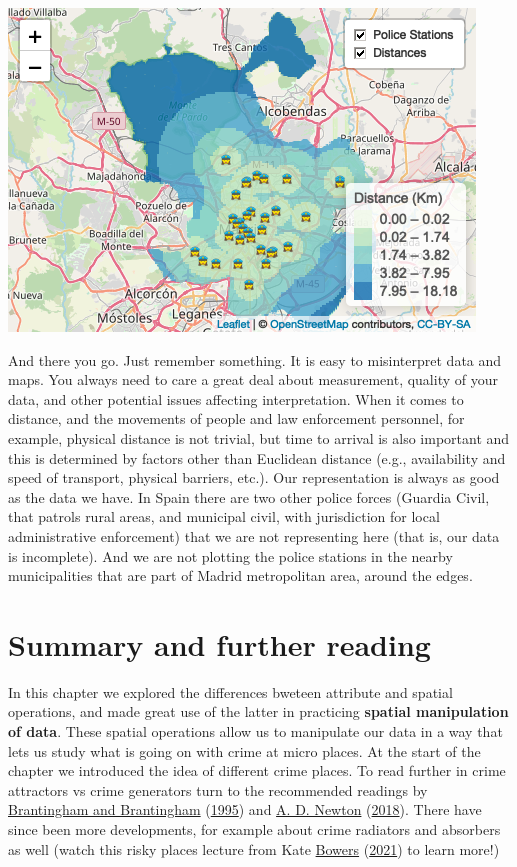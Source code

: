 \documentclass[
  krantz2]{krantz}
\begin{document}
\includegraphics{crime_mapping_files/figure-latex/unnamed-chunk-74-1.png}

And there you go. Just remember something. It is easy to misinterpret data and maps. You always need to care a great deal about measurement, quality of your data, and other potential issues affecting interpretation. When it comes to distance, and the movements of people and law enforcement personnel, for example, physical distance is not trivial, but time to arrival is also important and this is determined by factors other than Euclidean distance (e.g., availability and speed of transport, physical barriers, etc.). Our representation is always as good as the data we have. In Spain there are two other police forces (Guardia Civil, that patrols rural areas, and municipal civil, with jurisdiction for local administrative enforcement) that we are not representing here (that is, our data is incomplete). And we are not plotting the police stations in the nearby municipalities that are part of Madrid metropolitan area, around the edges.

\hypertarget{summary-and-further-reading-1}{%
\section{Summary and further reading}\label{summary-and-further-reading-1}}

In this chapter we explored the differences bweteen attribute and spatial operations, and made great use of the latter in practicing \textbf{spatial manipulation of data}. These spatial operations allow us to manipulate our data in a way that lets us study what is going on with crime at micro places. At the start of the chapter we introduced the idea of different crime places. To read further in crime attractors vs crime generators turn to the recommended readings by \protect\hyperlink{ref-Brantingham_1995}{Brantingham and Brantingham} (\protect\hyperlink{ref-Brantingham_1995}{1995}) and \protect\hyperlink{ref-Newton_2018}{A. D. Newton} (\protect\hyperlink{ref-Newton_2018}{2018}). There have since been more developments, for example about crime radiators and absorbers as well (watch this risky places lecture from Kate \protect\hyperlink{ref-Bowers_2021}{Bowers} (\protect\hyperlink{ref-Bowers_2021}{2021}) to learn more!)
\end{document}
